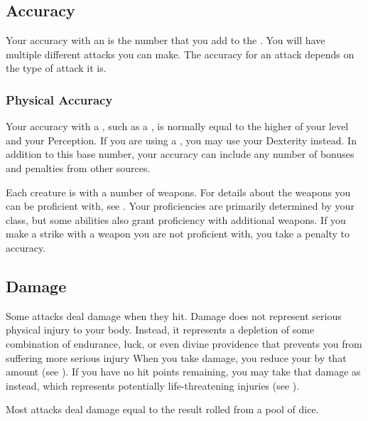     \subsection{Accuracy}\label{Accuracy}
        Your accuracy with an  is the number that you add to the .
        You will have multiple different attacks you can make.
        The accuracy for an attack depends on the type of attack it is.

        \subsubsection{Physical Accuracy}\label{Physical Accuracy}
            Your accuracy with a , such as a , is normally equal to the higher of your level and your Perception.
            If you are using a , you may use your Dexterity instead.
            In addition to this base number, your accuracy can include any number of bonuses and penalties from other sources.

             Each creature is  with a number of weapons.
            For details about the weapons you can be proficient with, see .
            Your proficiencies are primarily determined by your class, but some abilities also grant proficiency with additional weapons.
            If you make a strike with a weapon you are not proficient with, you take a  penalty to accuracy.

    \subsection{Damage}\label{Damage}
        Some attacks deal damage when they hit.
        Damage does not represent serious physical injury to your body.
        Instead, it represents a depletion of some combination of endurance, luck, or even divine providence that prevents you from suffering more serious injury
        When you take damage, you reduce your  by that amount (see ).
        If you have no hit points remaining, you may take that damage as  instead, which represents potentially life-threatening injuries (see ).

        Most attacks deal damage equal to the result rolled from a pool of dice.

